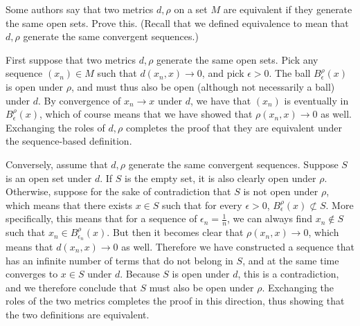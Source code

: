 \begin{exercise}{3}
    Some authors say that two metrics $d, \rho$ on a set $M$ are equivalent if they generate the same open sets.
    Prove this.
    (Recall that we defined equivalence to mean that $d, \rho$ generate the same convergent sequences.)
\end{exercise}

\begin{solution}
    
    First suppose that two metrics $d, \rho$ generate the same open sets.
    Pick any sequence $(x_n) \in M$ such that $d(x_n, x) \rightarrow 0$, and pick $\epsilon > 0$.
    The ball $B_{\epsilon}^{\rho}(x)$ is open under $\rho$, and must thus also be open (although not necessarily a ball) under $d$.
    By convergence of $x_n \rightarrow x$ under $d$, we have that $(x_n)$ is eventually in $B_{\epsilon}^{\rho}(x)$, which of course means that we have showed that $\rho(x_n, x) \rightarrow 0$ as well.
    Exchanging the roles of $d, \rho$ completes the proof that they are equivalent under the sequence-based definition.

    Conversely, assume that $d, \rho$ generate the same convergent sequences.
    Suppose $S$ is an open set under $d$.
    If $S$ is the empty set, it is also clearly open under $\rho$.
    Otherwise, suppose for the sake of contradiction that $S$ is not open under $\rho$, which means that there exists $x \in S$ such that for every $\epsilon > 0$, $B_{\epsilon}^{\rho}(x) \not\subset S$.
    More specifically, this means that for a sequence of $\epsilon_n = \frac{1}{n}$, we can always find $x_n \notin S$ such that $x_n \in B_{\epsilon_n}^{\rho}(x)$.
    But then it becomes clear that $\rho(x_n, x) \rightarrow 0$, which means that $d(x_n, x) \rightarrow 0$ as well.
    Therefore we have constructed a sequence that has an infinite number of terms that do not belong in $S$, and at the same time converges to $x \in S$ under $d$.
    Because $S$ is open under $d$, this is a contradiction, and we therefore conclude that $S$ must also be open under $\rho$.
    Exchanging the roles of the two metrics completes the proof in this direction, thus showing that the two definitions are equivalent.
\end{solution}